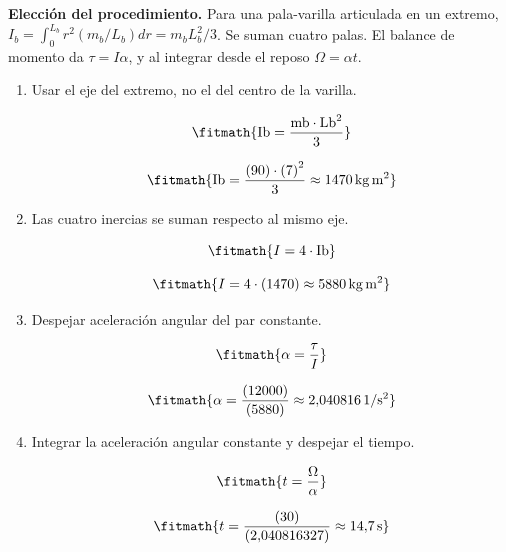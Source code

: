 \noindent\textbf{Elección del procedimiento.} Para una pala-varilla articulada en un extremo, $I_b=\int_0^{L_b}r^2(m_b/L_b)dr=m_bL_b^2/3$. Se suman cuatro palas. El balance de momento da $\tau=I\alpha$, y al integrar desde el reposo $\Omega=\alpha t$.

\begin{enumerate}

\item Usar el eje del extremo, no el del centro de la varilla.

\[\fitmath{\mathrm{Ib}=\frac{\mathrm{mb}\cdot {\mathrm{Lb}}^{2}}{3}}\]

\[\fitmath{\mathrm{Ib}=\frac{(90)\cdot {(7)}^{2}}{3}\approx 1470\,\mathrm{kg\,m^{2}}}\]

\item Las cuatro inercias se suman respecto al mismo eje.

\[\fitmath{I=4\cdot \mathrm{Ib}}\]

\[\fitmath{I=4\cdot (1470)\approx 5880\,\mathrm{kg\,m^{2}}}\]

\item Despejar aceleración angular del par constante.

\[\fitmath{\alpha=\frac{\tau}{I}}\]

\[\fitmath{\alpha=\frac{(12000)}{(5880)}\approx 2{,}040816\,\mathrm{1/s^{2}}}\]

\item Integrar la aceleración angular constante y despejar el tiempo.

\[\fitmath{t=\frac{\Omega}{\alpha}}\]

\[\fitmath{t=\frac{(30)}{(2{,}040816327)}\approx 14{,}7\,\mathrm{s}}\]

\end{enumerate}
